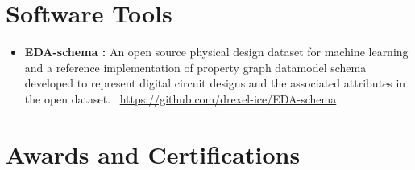 \documentclass[11pt,a4paper,sans]{moderncv}        %
\begin{document}
\section{Software Tools}
\begin{itemize}[labelindent=1.5em,leftmargin=*]
    \setlength\itemsep{-0.1em}
    \item \textbf{EDA-schema \cite{shrestha2024edaschema}:} An open source physical design dataset for machine learning and a reference implementation of property graph datamodel schema developed to represent digital circuit designs and the associated attributes in the open dataset. \hfill \faGithub ~\url{https://github.com/drexel-ice/EDA-schema}
\end{itemize}


\section{Awards and Certifications}









\end{document}
